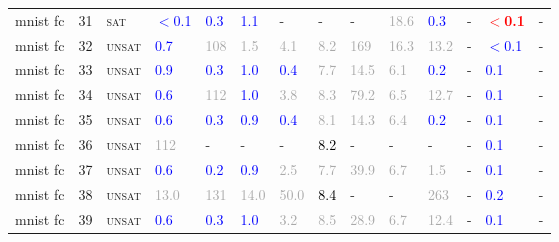 \begin{center}
{\begin{longtable}{@{}llllllllllllll@{}}
mnist fc & 31 & \textsc{sat} & \textcolor{blue}{$<$0.1} & \textcolor{blue}{0.3} & \textcolor{blue}{1.1} & - & - & - & \textcolor{darkgray}{18.6} & \textcolor{blue}{0.3} & - & \textbf{\textcolor{red}{$<$0.1}} & - \\
mnist fc & 32 & \textsc{unsat} & \textcolor{blue}{0.7} & \textcolor{darkgray}{108} & \textcolor{darkgray}{1.5} & \textcolor{darkgray}{4.1} & \textcolor{darkgray}{8.2} & \textcolor{darkgray}{169} & \textcolor{darkgray}{16.3} & \textcolor{darkgray}{13.2} & - & \textcolor{blue}{$<$0.1} & - \\
mnist fc & 33 & \textsc{unsat} & \textcolor{blue}{0.9} & \textcolor{blue}{0.3} & \textcolor{blue}{1.0} & \textcolor{blue}{0.4} & \textcolor{darkgray}{7.7} & \textcolor{darkgray}{14.5} & \textcolor{darkgray}{6.1} & \textcolor{blue}{0.2} & - & \textcolor{blue}{0.1} & - \\
mnist fc & 34 & \textsc{unsat} & \textcolor{blue}{0.6} & \textcolor{darkgray}{112} & \textcolor{blue}{1.0} & \textcolor{darkgray}{3.8} & \textcolor{darkgray}{8.3} & \textcolor{darkgray}{79.2} & \textcolor{darkgray}{6.5} & \textcolor{darkgray}{12.7} & - & \textcolor{blue}{0.1} & - \\
mnist fc & 35 & \textsc{unsat} & \textcolor{blue}{0.6} & \textcolor{blue}{0.3} & \textcolor{blue}{0.9} & \textcolor{blue}{0.4} & \textcolor{darkgray}{8.1} & \textcolor{darkgray}{14.3} & \textcolor{darkgray}{6.4} & \textcolor{blue}{0.2} & - & \textcolor{blue}{0.1} & - \\
mnist fc & 36 & \textsc{unsat} & \textcolor{darkgray}{112} & - & - & - & \textcolor{black}{8.2} & - & - & - & - & \textcolor{blue}{0.1} & - \\
mnist fc & 37 & \textsc{unsat} & \textcolor{blue}{0.6} & \textcolor{blue}{0.2} & \textcolor{blue}{0.9} & \textcolor{darkgray}{2.5} & \textcolor{darkgray}{7.7} & \textcolor{darkgray}{39.9} & \textcolor{darkgray}{6.7} & \textcolor{darkgray}{1.5} & - & \textcolor{blue}{0.1} & - \\
mnist fc & 38 & \textsc{unsat} & \textcolor{darkgray}{13.0} & \textcolor{darkgray}{131} & \textcolor{darkgray}{14.0} & \textcolor{darkgray}{50.0} & \textcolor{black}{8.4} & - & - & \textcolor{darkgray}{263} & - & \textcolor{blue}{0.2} & - \\
mnist fc & 39 & \textsc{unsat} & \textcolor{blue}{0.6} & \textcolor{blue}{0.3} & \textcolor{blue}{1.0} & \textcolor{darkgray}{3.2} & \textcolor{darkgray}{8.5} & \textcolor{darkgray}{28.9} & \textcolor{darkgray}{6.7} & \textcolor{darkgray}{12.4} & - & \textcolor{blue}{0.1} & - \\

\end{longtable}}
\end{center}
